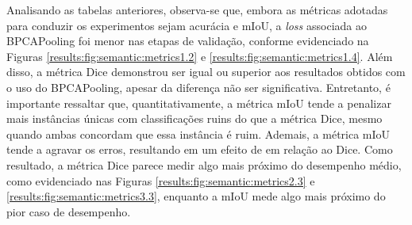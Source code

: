 Analisando as tabelas anteriores, observa-se que, embora as métricas adotadas para conduzir os experimentos sejam acurácia e mIoU, a \textit{loss} associada ao BPCAPooling foi menor nas etapas de validação, conforme evidenciado na Figuras \ref{results:fig:semantic:metrics1.2} e \ref{results:fig:semantic:metrics1.4}. Além disso, a métrica Dice demonstrou ser igual ou superior aos resultados obtidos com o uso do BPCAPooling, apesar da diferença não ser significativa. Entretanto, é importante ressaltar que, quantitativamente, a métrica mIoU tende a penalizar mais instâncias únicas com classificações ruins do que a métrica Dice, mesmo quando ambas concordam que essa instância é ruim. Ademais, a métrica mIoU tende a agravar os erros, resultando em um efeito de  em relação ao Dice. Como resultado, a métrica Dice parece medir algo mais próximo do desempenho médio, como evidenciado nas Figuras \ref{results:fig:semantic:metrics2.3} e \ref{results:fig:semantic:metrics3.3}, enquanto a mIoU mede algo mais próximo do pior caso de desempenho.

